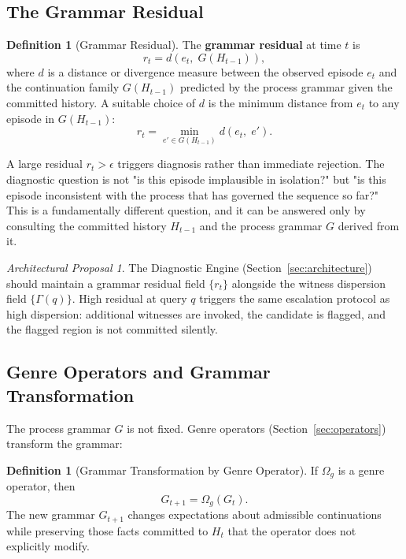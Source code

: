 \documentclass[11pt,a4paper]{article}
\theoremstyle{plain}
\theoremstyle{definition}
\newtheorem{definition}[theorem]{Definition}
\theoremstyle{remark}
\newtheorem{proposal}[theorem]{Architectural Proposal}
\begin{document}
\subsection{The Grammar Residual}

\begin{definition}[Grammar Residual]
The \textbf{grammar residual} at time $t$ is
\[
r_t = d(e_t,\; G(H_{t-1})),
\]
where $d$ is a distance or divergence measure between the observed episode $e_t$ and the continuation family $G(H_{t-1})$ predicted by the process grammar given the committed history. A suitable choice of $d$ is the minimum distance from $e_t$ to any episode in $G(H_{t-1})$:
\[
r_t = \min_{e' \in G(H_{t-1})} d(e_t,\; e').
\]
\end{definition}

A large residual $r_t > \epsilon$ triggers diagnosis rather than immediate rejection. The diagnostic question is not "is this episode implausible in isolation?" but "is this episode inconsistent with the process that has governed the sequence so far?" This is a fundamentally different question, and it can be answered only by consulting the committed history $H_{t-1}$ and the process grammar $G$ derived from it.

\begin{proposal}
The Diagnostic Engine (Section~\ref{sec:architecture}) should maintain a grammar residual field $\{r_t\}$ alongside the witness dispersion field $\{\Gamma(q)\}$. High residual at query $q$ triggers the same escalation protocol as high dispersion: additional witnesses are invoked, the candidate is flagged, and the flagged region is not committed silently.
\end{proposal}

\subsection{Genre Operators and Grammar Transformation}

The process grammar $G$ is not fixed. Genre operators (Section~\ref{sec:operators}) transform the grammar:

\begin{definition}[Grammar Transformation by Genre Operator]
If $\Omega_g$ is a genre operator, then
\[
G_{t+1} = \Omega_g(G_t).
\]
The new grammar $G_{t+1}$ changes expectations about admissible continuations while preserving those facts committed to $H_t$ that the operator does not explicitly modify.
\end{definition}
\end{document}
